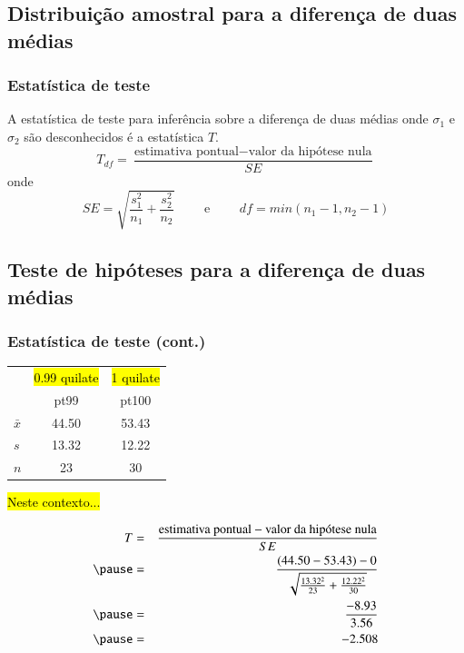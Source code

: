 
\subsection{Distribuição amostral para a diferença de duas médias}


\begin{frame}
\frametitle{Estatística de teste}
\justifying
{}
\justifying
{A estatística de teste para inferência sobre a diferença de duas médias onde $\sigma_1$ e $\sigma_2$ são desconhecidos é a estatística $T$.
\vspace{0.3 cm}
\[ T_{df} = \frac{\text{estimativa pontual} - \text{valor da hipótese nula}}{SE} \]
onde 
\[ SE = \sqrt{ \frac{s_1^2}{n_1} + \frac{s_2^2}{n_2} } \qquad \text{ e } \qquad df = min(n_1 - 1, n_2 - 1) \]
}\justifying
\justifying
{}

\end{frame}


\subsection{Teste de hipóteses para a diferença de duas médias}


\begin{frame}
\frametitle{Estatística de teste (cont.)}

{\small
\begin{center}
\begin{tabular}{l | c | c}
		& {\footnotesize \hl{0.99 quilate}} &  {\footnotesize \hl{1 quilate}}  \\
		& pt99	& pt100 \\
\hline
$\bar{x}$	& 44.50		& 53.43 \\
$s$		& 13.32		& 12.22 \\
$n$		& 23			& 30
\end{tabular}
\end{center}
}

\hl{Neste contexto...}

\pause

{\small
\begin{eqnarray*}
T &=& \frac{\text{estimativa pontual} - \text{valor da hipótese nula} }{SE} \\
\pause
&=& \frac{(44.50 - 53.43) - 0}{ \sqrt{\frac{13.32^2}{23} + \frac{12.22^2}{30} }} \\
\pause
&=& \frac{-8.93}{3.56} \\
\pause
&=& -2.508
\end{eqnarray*}
}

\end{frame}

